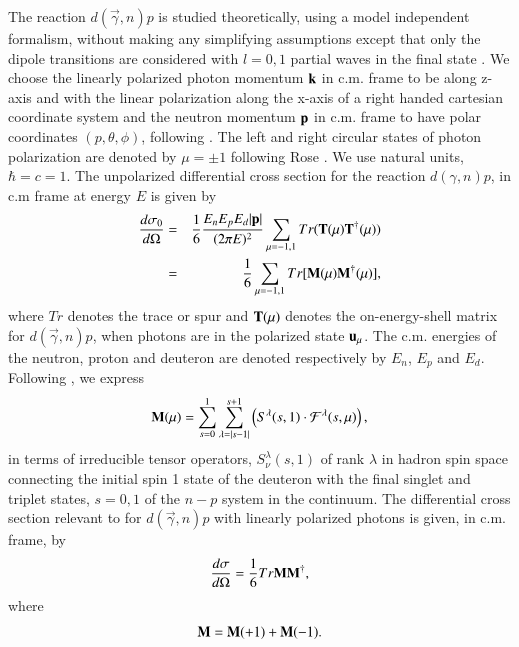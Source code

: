 The reaction $d(\vec \gamma, n)p$ is studied theoretically, using a model independent formalism, without making any simplifying assumptions  except that only the dipole transitions are considered with $l=0,1$  partial waves in the final state \cite{chap34-key50}. We choose the linearly polarized photon momentum ${\bf k}$ in c.m. frame to be along z-axis and with the linear polarization along the x-axis of a right handed cartesian coordinate system and the neutron momentum ${\bf p}$ in c.m. frame to have polar coordinates $(p,\theta,\phi)$, following \cite{chap34-key45}. The left and right circular states of photon polarization are denoted by $\mu =\pm 1$  following Rose \cite{chap34-key51}.  We use natural units, $\hbar = c=1$.  The unpolarized differential cross section for the reaction $d(\gamma, n)p$, in c.m frame at energy $E$ is given by 
\makeatletter
{}
\makeatother
\begin{eqnarray}
{d\sigma_0 \over d\Omega}&=&{1 \over 6} { E_n E_p E_d |{\bf p}| \over (2\pi E)^2 } \sum_{\mu=-1,1} Tr({\bf T}(\mu) {\bf T}^\dagger(\mu)) \nonumber \\ 
 &=& {1 \over 6} \sum_{\mu=-1,1} Tr[{\bf M}(\mu) {\bf M}^\dagger(\mu)], \label{chap34-eq1}
\end{eqnarray}
where $Tr$ denotes the trace or spur and ${\bf T}(\mu)$ denotes the on-energy-shell matrix for $d(\vec \gamma, n)p$,  when photons are in the polarized state ${\bf u}_\mu$. The c.m. energies of the neutron, proton and deuteron are denoted respectively by $E_n$, $E_p$ and  $E_d$.  Following \cite{chap34-key52}, we express 
\begin{equation}
{\bf M}(\mu) = \sum_{s=0}^1 \sum_{\lambda = |s-1|}^{s+1} \left(S^\lambda(s,1) \cdot {\mathcal F}^\lambda(s,\mu)\right), \label{chap34-eq2}
\end{equation}
in terms of irreducible tensor operators, $S^\lambda_{\nu}(s,1)$ of rank $\lambda$ in hadron spin space \cite{chap34-key53} connecting the initial spin 1 state of the deuteron with the final singlet and triplet states, $s=0,1$ of  the $n-p$ system in the continuum.  The differential cross section relevant to \cite{chap34-key45,chap34-key46} for $d(\vec \gamma, n)p$ with linearly  polarized photons is given, in c.m. frame, by  
\begin{eqnarray}
{d\sigma \over d\Omega} ={1 \over 6} Tr {\bf M M^\dagger}, \label{chap34-eq3}
\end{eqnarray}
where
\begin{equation} 
{\bf M= M}(+1)+{\bf M}(-1).\label{chap34-eq4}
\end{equation}
